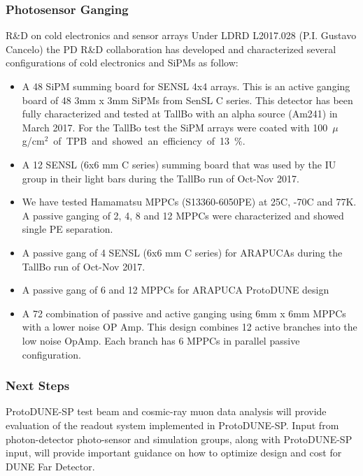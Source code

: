 \subsubsection{Photosensor Ganging}
R\&D on cold electronics and sensor arrays
Under LDRD L2017.028 (P.I. Gustavo Cancelo) the PD R\&D collaboration has developed and characterized several configurations of cold electronics and SiPMs as follow:
\begin{itemize}
\item A 48 SiPM summing board for SENSL 4x4 arrays. This is an active ganging board of 48 3mm x 3mm SiPMs from SenSL C series. This detector has been fully characterized and tested at TallBo with an alpha source (Am241) in March 2017. For the TallBo test the SiPM arrays were coated with \SI{100}{$\mu$g/cm$^2$} of TPB and showed an efficiency of 13\%.
\item A 12 SENSL (6x6 mm C series) summing board that was used by the IU group in their light bars during the TallBo run of Oct-Nov 2017.
\item We have tested Hamamatsu MPPCs (S13360-6050PE) at 25C, -70C and 77K. A passive ganging of 2, 4, 8 and 12 MPPCs were characterized and showed single PE separation.
\item A passive gang of 4 SENSL (6x6 mm C series) for ARAPUCAs during the TallBo run of Oct-Nov 2017.
\item A passive gang of 6 and 12 MPPCs for ARAPUCA ProtoDUNE design
\item A 72 combination of passive and active ganging using 6mm x 6mm MPPCs with a lower noise OP Amp. This design combines 12 active branches into the low noise OpAmp. Each branch has 6 MPPCs in parallel passive configuration.
\end{itemize}


\subsubsection{Next Steps}

ProtoDUNE-SP test beam and cosmic-ray muon data analysis will provide evaluation of the readout system implemented in ProtoDUNE-SP.
Input from photon-detector photo-sensor and simulation groups, along with ProtoDUNE-SP input,  will provide important guidance on
how to optimize design and cost for DUNE Far Detector.

